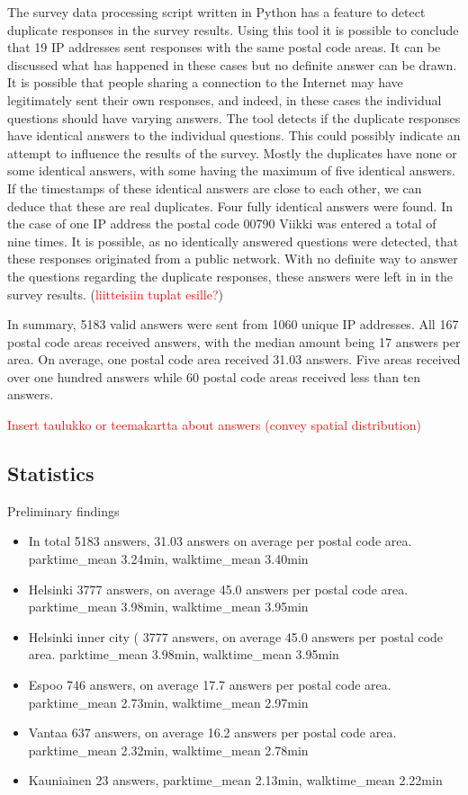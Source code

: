 The survey data processing script written in Python has a feature to detect duplicate responses in the survey results. Using this tool it is possible to conclude that 19 IP addresses sent responses with the same postal code areas. It can be discussed what has happened in these cases but no definite answer can be drawn. It is possible that people sharing a connection to the Internet may have legitimately sent their own responses, and indeed, in these cases the individual questions should have varying answers. The tool detects if the duplicate responses have identical answers to the individual questions. This could possibly indicate an attempt to influence the results of the survey. Mostly the duplicates have none or some identical answers, with some having the maximum of five identical answers. If the timestamps of these identical answers are close to each other, we can deduce that these are real duplicates. Four fully identical answers were found. In the case of one IP address the postal code 00790 Viikki was entered a total of nine times. It is possible, as no identically answered questions were detected, that these responses originated from a public network. With no definite way to answer the questions regarding the duplicate responses, these answers were left in in the survey results. (\textcolor{red}{liitteisiin tuplat esille?})

In summary, 5183 valid answers were sent from 1060 unique IP addresses. All 167 postal code areas received answers, with the median amount being 17 answers per area. On average, one postal code area received 31.03 answers. Five areas received over one hundred answers while 60 postal code areas received less than ten answers.

\textcolor{red}{Insert taulukko or teemakartta about answers (convey spatial distribution)}

\subsection{Statistics}
\justify
Preliminary findings
\begin{itemize}
    \item In total 5183 answers, 31.03 answers on average per postal code area. parktime\_mean 3.24min, walktime\_mean 3.40min
    \item Helsinki 3777 answers, on average 45.0 answers per postal code area. parktime\_mean 3.98min, walktime\_mean 3.95min
    \item Helsinki inner city ( 3777 answers, on average 45.0 answers per postal code area. parktime\_mean 3.98min, walktime\_mean 3.95min
    \item Espoo 746 answers, on average 17.7 answers per postal code area. parktime\_mean 2.73min, walktime\_mean 2.97min
    \item Vantaa 637 answers, on average 16.2 answers per postal code area. parktime\_mean 2.32min, walktime\_mean 2.78min
    \item Kauniainen 23 answers, parktime\_mean 2.13min, walktime\_mean 2.22min
\end{itemize}